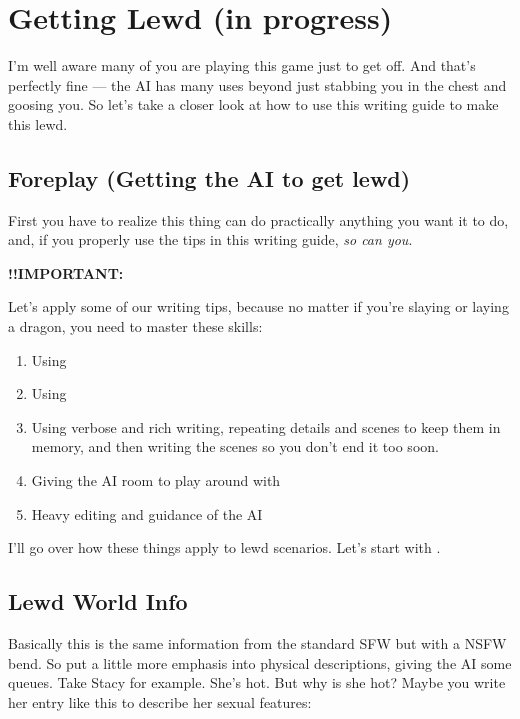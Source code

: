 \documentclass[Avsfag-main.tex]{subfiles}
\begin{document}
\section{Getting Lewd (in progress)}
\label{sec:lewd}

I'm well aware many of you are playing this game just to get off.
And that's perfectly fine --- the AI has many uses beyond just stabbing you in the chest and goosing you.
So let's take a closer look at how to use this writing guide to make this lewd.

\subsection{Foreplay (Getting the AI to get lewd)}

First you have to realize this thing can do practically anything you
want it to do, and, if you properly use the tips in this writing guide,
\emph{so can you}.

\smallskip
\textbf{!!IMPORTANT:}

\smallskip

Let's apply some of our writing tips, because no matter if you're slaying or laying a dragon, you need to master these skills:

\begin{enumerate}
\item
  Using 
\item
  Using 
\item
  Using verbose and rich writing, repeating details and scenes to keep
  them in memory, and then writing the scenes so you don't end it too
  soon.
\item
  Giving the AI room to play around with
\item
  Heavy editing and guidance of the AI
\end{enumerate}

I'll go over how these things apply to lewd scenarios.
Let's start with \wi.

\subsection{Lewd World Info}

Basically this is the same information from the standard SFW but with a NSFW bend.
So put a little more emphasis into physical descriptions, giving the AI some queues.
Take Stacy for example.
She's hot.
But why is she hot?
Maybe you write her \wi entry like this to describe her sexual features:
\end{document}
